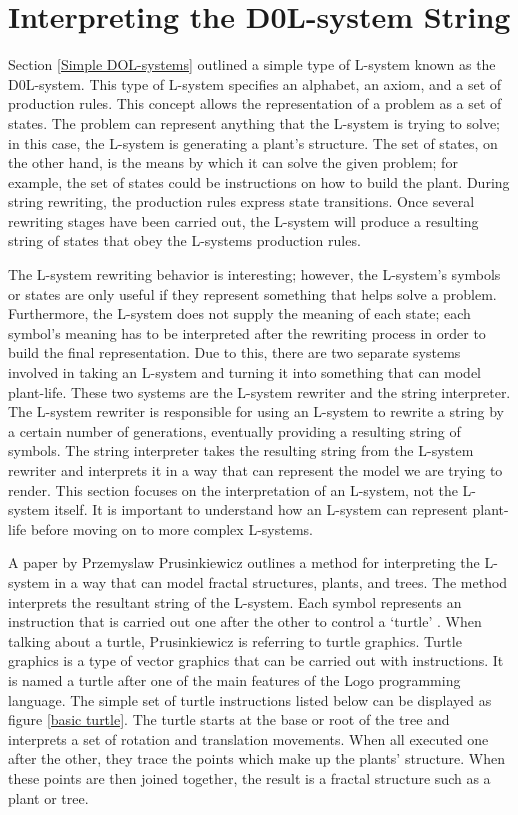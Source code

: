 \section{Interpreting the D0L-system String} \label{Interpreting DOL-system}

Section \ref{Simple DOL-systems} outlined a simple type of L-system known as the D0L-system. This type of L-system specifies an alphabet, an axiom, and a set of production rules. This concept allows the representation of a problem as a set of states. The problem can represent anything that the L-system is trying to solve; in this case, the L-system is generating a plant's structure. The set of states, on the other hand, is the means by which it can solve the given problem; for example, the set of states could be instructions on how to build the plant. During string rewriting, the production rules express state transitions. Once several rewriting stages have been carried out, the L-system will produce a resulting string of states that obey the L-systems production rules. 

The L-system rewriting behavior is interesting; however, the L-system's symbols or states are only useful if they represent something that helps solve a problem. Furthermore, the L-system does not supply the meaning of each state; each symbol's meaning has to be interpreted after the rewriting process in order to build the final representation. Due to this, there are two separate systems involved in taking an L-system and turning it into something that can model plant-life. These two systems are the L-system rewriter and the string interpreter. The L-system rewriter is responsible for using an L-system to rewrite a string by a certain number of generations, eventually providing a resulting string of symbols. The string interpreter takes the resulting string from the L-system rewriter and interprets it in a way that can represent the model we are trying to render. This section focuses on the interpretation of an L-system, not the L-system itself. It is important to understand how an L-system can represent plant-life before moving on to more complex L-systems.

A paper by Przemyslaw Prusinkiewicz outlines a method for interpreting the L-system in a way that can model fractal structures, plants, and trees. The method interprets the resultant string of the L-system. Each symbol represents an instruction that is carried out one after the other to control a `turtle' \cite{prusinkiewicz1986graphical}. When talking about a turtle, Prusinkiewicz is referring to turtle graphics. Turtle graphics is a type of vector graphics that can be carried out with instructions. It is named a turtle after one of the main features of the Logo programming language. The simple set of turtle instructions listed below can be displayed as figure \ref{basic turtle}. The turtle starts at the base or root of the tree and interprets a set of rotation and translation movements. When all executed one after the other, they trace the points which make up the plants' structure. When these points are then joined together, the result is a fractal structure such as a plant or tree.

